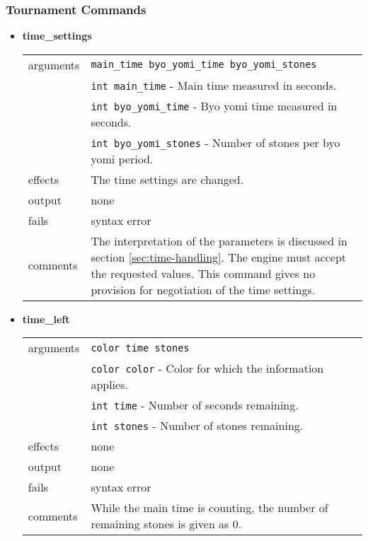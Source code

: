 \documentclass[a4paper]{article}
\begin{document}
\subsubsection{Tournament Commands}
\begin{itemize}
\item \textbf{time\_settings} \\
  \begin{tabularx}{\linewidth}{lX}
    arguments & \texttt{main\_time byo\_yomi\_time byo\_yomi\_stones} \\
    & \texttt{int main\_time}        - Main time measured in seconds.\\
    & \texttt{int byo\_yomi\_time}   - Byo yomi time measured in seconds.\\
    & \texttt{int byo\_yomi\_stones} - Number of stones per byo yomi period.\\
    effects &   The time settings are changed. \\
    output &    none \\
    fails &     syntax error \\
    comments &  The interpretation of the parameters is discussed in
                section \ref{sec:time-handling}.
                The engine must accept the requested values. This command
                gives no provision for negotiation of the time settings.
  \end{tabularx}

\newpage
\item \textbf{time\_left} \\
  \begin{tabularx}{\linewidth}{lX}
    arguments & \texttt{color time stones} \\
    & \texttt{color color} - Color for which the information applies.\\
    & \texttt{int time}    - Number of seconds remaining.\\
    & \texttt{int stones}  - Number of stones remaining.\\
    effects &   none \\
    output &    none \\
    fails &     syntax error \\
    comments &  While the main time is counting, the number of remaining
                stones is given as 0.\\
  \end{tabularx}


\end{itemize}
\end{document}
